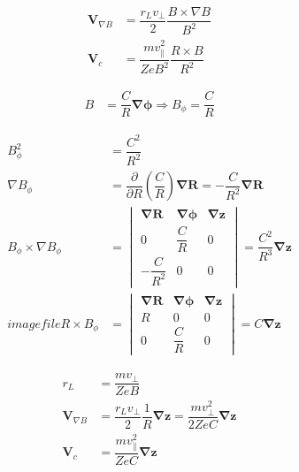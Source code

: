 \documentclass[10pt,a4paper]{article}
\begin{document}
		\begin{align}
			\bm{V}_{\nabla B} &= \dfrac{r_{L} v_{\perp}}{2} \dfrac{B \times \nabla B}{B^{2}} \label{e:vnabb}
			\\
			\bm{V}_{c} &= \dfrac{m v_{\parallel}^{2}}{Z e B^{2}} \dfrac{R \times B}{R^{2}}
			\label{e:vc}
		\end{align}
		
		\begin{align}
			B &= \dfrac{C}{R} \bm{\nabla \phi} \Rightarrow B_{\phi} = \dfrac{C}{R}
			\label{e:b}
		\end{align}
		
		\begin{align}
			B_{\phi}^{2} &= \dfrac{C^{2}}{R^{2}} \label{e:calcstart} \\
			\nabla B_{\phi} &= \dfrac{\partial }{\partial R} \left(\dfrac{C}{R}\right) \bm{\nabla R} = - \dfrac{C}{R^{2}} \bm{\nabla R} \\
			B_{\phi} \times \nabla B_{\phi} &= 
				\begin{vmatrix}
					\bm{\nabla R} & \bm{\nabla \phi} & \bm{\nabla z} \\
					0 & \dfrac{C}{R} & 0 \\
					-\dfrac{C}{R^{2}} & 0 & 0
				\end{vmatrix} = \dfrac{C^{2}}{R^{3}} \bm{\nabla z} \\
		imagefile	R \times B_{\phi} &= 
				\begin{vmatrix}
					\bm{\nabla R} & \bm{\nabla \phi} & \bm{\nabla z} \\
					R & 0 & 0 \\
					0 & \dfrac{C}{R} & 0
				\end{vmatrix}  = C \bm{\nabla z}
				\label{e:calcend}
		\end{align}
		
		\begin{align}
			r_{L} &= \dfrac{m v_{\perp}}{Z e B} \\
			\bm{V}_{\nabla B} &= \dfrac{r_{L} v_{\perp}}{2} \dfrac{1}{R} \bm{\nabla z} =  \dfrac{m v_{\perp}^{2}}{2 Z e C} \bm{\nabla z} \label{e:vnabbf} \\
			\bm{V}_{c} &= \dfrac{m v_{\parallel}^{2}}{Z e C} \bm{\nabla z} \label{e:vcf}
		\end{align}
		
\end{document}
